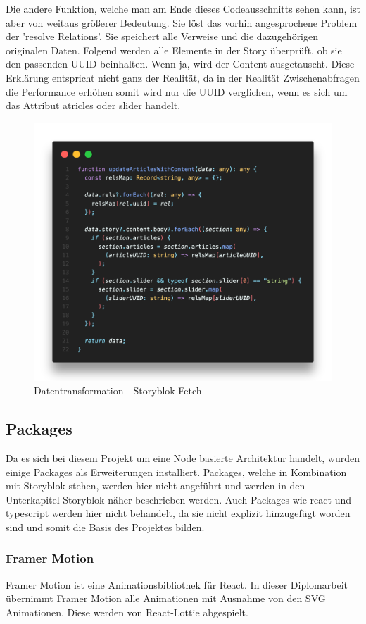Die andere Funktion, welche man am Ende dieses Codeausschnitts sehen kann, ist aber von weitaus größerer Bedeutung. Sie löst das vorhin angesprochene Problem der 'resolve Relations'. Sie speichert alle Verweise und die dazugehörigen originalen Daten. Folgend werden alle Elemente in der Story überprüft, ob sie den passenden UUID beinhalten. Wenn ja, wird der Content ausgetauscht. Diese Erklärung entspricht nicht ganz der Realität, da in der Realität Zwischenabfragen die Performance erhöhen somit wird nur die UUID verglichen, wenn es sich um das Attribut atricles oder slider handelt.
\begin{figure}[H]
    \centering
    \includegraphics[width=\linewidth]{pics/sb-fetch-02.png}
    \caption{Datentransformation - Storyblok Fetch}
\end{figure}


\subsection{Packages}
Da es sich bei diesem Projekt um eine Node basierte Architektur handelt, wurden einige Packages als Erweiterungen installiert. 
Packages, welche in Kombination mit Storyblok stehen, werden hier nicht angeführt und werden in den Unterkapitel Storyblok näher beschrieben werden. Auch Packages wie react und typescript werden hier nicht behandelt, da sie nicht explizit hinzugefügt worden sind und somit die Basis des Projektes bilden.

\subsubsection*{Framer Motion}
Framer Motion ist eine Animationsbibliothek für React. In dieser Diplomarbeit übernimmt Framer Motion alle Animationen mit Ausnahme von den SVG Animationen. Diese werden von React-Lottie abgespielt.

